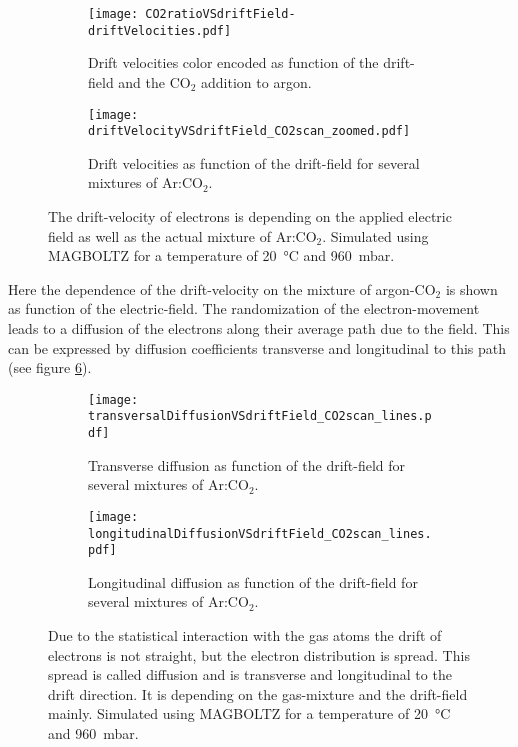 \documentclass[
twoside,            %
BCOR1.4cm,          %
10pt,               %
headings=normal,    %
headsepline,        %
clearplainpage,		%
final,              %
div=14,
open=right,
bibliography=toc
]{scrreprt}
\begin{document}
\begin{figure}[!h]
	\begin{subfigure}[b]{0.48\textwidth}
		\centering
		\texttt{[image: CO2ratioVSdriftField-driftVelocities.pdf]}
		\caption{
			Drift velocities color encoded as function of the drift-field and the CO$_{2}$ addition to argon. 
		}
		\label{CO2ratioVSdriftField-driftVelocities} 
	\end{subfigure}
	\hfill
	\begin{subfigure}[b]{0.48\textwidth}
		\centering
		\texttt{[image: driftVelocityVSdriftField\_CO2scan\_zoomed.pdf]}
		\caption{
			Drift velocities as function of the drift-field for several mixtures of Ar:CO$_{2}$.
		}
		\label{driftVelocityVSdriftField_CO2scan_zoomed} 
	\end{subfigure}
	\vspace{-2mm}
	\caption{
		The drift-velocity of electrons is depending on the applied electric field as well as the actual mixture of Ar:CO$_{2}$.
		Simulated using MAGBOLTZ \cite{magboltz} for a temperature of \SI{20}{\degreeCelsius} and \SI{960}{\milli\bar}.
	}
\label{driftVelocities}
\end{figure}

Here the dependence of the drift-velocity on the mixture of argon-CO$_{2}$ is shown as function of the electric-field.
The randomization of the electron-movement leads to a diffusion of the electrons along their average path due to the field.
This can be expressed by diffusion coefficients transverse and longitudinal to this path (see figure \ref{diffusion}).

\begin{figure}[!h]
	\begin{subfigure}[b]{0.48\textwidth}
		\centering
		\texttt{[image: transversalDiffusionVSdriftField\_CO2scan\_lines.pdf]}
		\caption{
			Transverse diffusion as function of the drift-field for several mixtures of Ar:CO$_{2}$.
		}
		\label{transversalDiffusionVSdriftField_CO2scan_zoomed} 
	\end{subfigure}
	\hfill
	\begin{subfigure}[b]{0.48\textwidth}
		\centering
		\texttt{[image: longitudinalDiffusionVSdriftField\_CO2scan\_lines.pdf]}
		\caption{
			Longitudinal diffusion as function of the drift-field for several mixtures of Ar:CO$_{2}$.
		}
		\label{longitudinalDiffusionVSdriftField_CO2scan_zoomed} 
	\end{subfigure}
	\vspace{-2mm}
	\caption{
		Due to the statistical interaction with the gas atoms the drift of electrons is not straight, but the electron distribution is spread.
		This spread is called diffusion and is transverse and longitudinal to the drift direction.
		It is depending on the gas-mixture and the drift-field mainly.
		Simulated using MAGBOLTZ \cite{magboltz} for a temperature of \SI{20}{\degreeCelsius} and \SI{960}{\milli\bar}.
	}
	\label{diffusion}
\end{figure}
\end{document}
